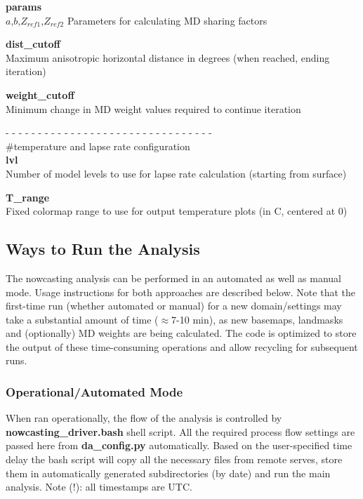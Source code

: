 \documentclass{article}
\begin{document}
\noindent \textbf{params}\\
$a$,$b$,$Z_{ref1}$,$Z_{ref2}$ Parameters for calculating MD sharing factors

\vspace{0.1cm}
\noindent \textbf{dist\_cutoff}\\
Maximum anisotropic horizontal distance in degrees (when reached, ending iteration)

\vspace{0.1cm}
\noindent \textbf{weight\_cutoff}\\
Minimum change in MD weight values required to continue iteration


\vspace{0.5cm}
\noindent- - - - - - - - - - - - - - - - - - - - - - - - - - - - - - - -\\
\noindent\#temperature and lapse rate configuration\\

\noindent \textbf{lvl}\\
Number of model levels to use for lapse rate calculation (starting from surface)

\vspace{0.1cm}
\noindent \textbf{T\_range}\\
Fixed colormap range to use for output temperature plots (in C, centered at 0)


\subsection{Ways to Run the Analysis}\label{sec:run}
The nowcasting analysis can be performed in an automated as well as manual mode. Usage instructions for both approaches are described below. Note that the first-time run (whether automated or manual) for a new domain/settings may take a substantial amount of time ($\approx$7-10 min), as new basemaps, landmasks and (optionally) MD weights are being calculated. The code is optimized to store the output of these time-consuming operations and allow recycling for subsequent runs. 

\subsubsection{Operational/Automated Mode}
When ran operationally, the flow of the analysis is controlled by \textbf{nowcasting\_driver.bash} shell script. All the required process flow settings are passed here from \textbf{da\_config.py} automatically. Based on the user-specified time delay the bash script will copy all the necessary files from remote serves, store them in automatically generated subdirectories (by date) and run the main analysis. Note (!): all timestamps are UTC. \\
\end{document}
